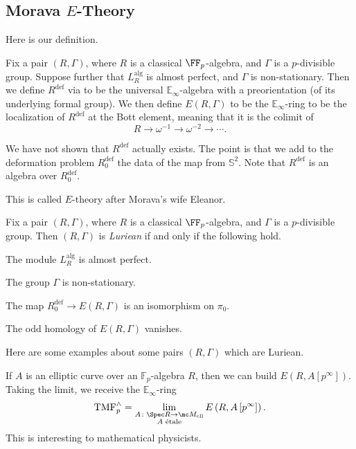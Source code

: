 \documentclass[../notes.tex]{subfiles}
\begin{document}
\subsection{Morava \texorpdfstring{$E$}{ E}-Theory}
Here is our definition.
\begin{definition}[Morava]
	Fix a pair $(R,\Gamma)$, where $R$ is a classical $\FF_p$-algebra, and $\Gamma$ is a $p$-divisible group. Suppose further that $L_R^{\mathrm{alg}}$ is almost perfect, and $\Gamma$ is non-stationary. Then we define $R^{\mathrm{def}}$ via  to be the universal $\mathbb E_\infty$-algebra with a preorientation (of its underlying formal group). We then define $E(R,\Gamma)$ to be the $\mathbb E_\infty$-ring to be the localization of $R^{\mathrm{def}}$ at the Bott element, meaning that it is the colimit of
	\[R\to\omega^{-1}\to\omega^{-2}\to\cdots.\]
\end{definition}
\begin{remark}
	We have not shown that $R^{\mathrm{def}}$ actually exists. The point is that we add to the deformation problem $R_0^{\mathrm{def}}$ the data of the map from $\mathbb S^2$. Note that $R^{\mathrm{def}}$ is an algebra over $R_0^{\mathrm{def}}$.
\end{remark}
\begin{remark}
	This is called $E$-theory after Morava's wife Eleanor.
\end{remark}
\begin{definition}[Luriean]
	Fix a pair $(R,\Gamma)$, where $R$ is a classical $\FF_p$-algebra, and $\Gamma$ is a $p$-divisible group. Then $(R,\Gamma)$ is \textit{Luriean} if and only if the following hold.
	\begin{listalph}
		\item The module $L_R^{\mathrm{alg}}$ is almost perfect.
		\item The group $\Gamma$ is non-stationary.
		\item The map $R_0^{\mathrm{def}}\to E(R,\Gamma)$ is an isomorphism on $\pi_0$.
		\item The odd homology of $E(R,\Gamma)$ vanishes.
	\end{listalph}
\end{definition}
Here are some examples about some pairs $(R,\Gamma)$ which are Luriean.
\begin{example}
	If $A$ is an elliptic curve over an $\mathbb F_p$-algebra $R$, then we can build $E(R,A\left[p^\infty\right])$. Taking the limit, we receive the $\mathbb E_\infty$-ring
	\[\mathrm{TMF}^\land_p=\lim_{\substack{A\colon\Spec R\to\mc M_{\mathrm{ell}}\\A\text{ \'etale}}}E\left(R,A\left[p^\infty\right]\right).\]
	This is interesting to mathematical physicists.
\end{example}
\end{document}
